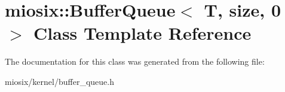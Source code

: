 \hypertarget{classmiosix_1_1_buffer_queue_3_01_t_00_01size_00_010_01_4}{\section{miosix\-:\-:Buffer\-Queue$<$ T, size, 0 $>$ Class Template Reference}
\label{classmiosix_1_1_buffer_queue_3_01_t_00_01size_00_010_01_4}
}


The documentation for this class was generated from the following file\-:\begin{DoxyCompactItemize}
\item 
miosix/kernel/buffer\-\_\-queue.\-h\end{DoxyCompactItemize}
